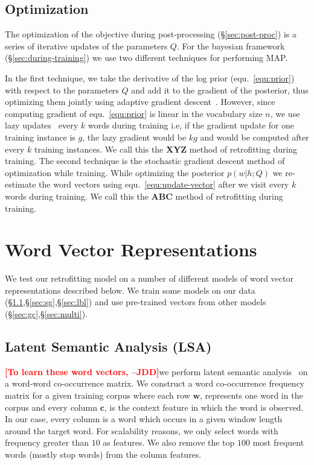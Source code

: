 \documentclass[11pt]{article}
\newcommand{\jdd}[1]{\textcolor{red}{\bf\small [#1 --JDD]}}
\begin{document}
\subsection{Optimization}
\label{sec:optimization} 

The optimization of the objective during post-processing (\S\ref{sec:post-proc}) is a series of iterative
updates of the parameters $Q$. For the bayesian framework (\S\ref{sec:during-training}) we use two different
techniques for performing MAP. 

In the first technique, we take the derivative of the log prior (equ.~\ref{equ:prior}) with respect to the
parameters $Q$ and add it to the gradient of the posterior, thus optimizing them jointly
using adaptive gradient descent~\cite{Duchi:EECS-2010-24}.
However, since computing gradient of equ.~\ref{equ:prior}
is linear in the vocabulary size $n$, we use lazy updates~\cite{Carpenter08lazysparse} every
$k$ words during training i.e, if the gradient update for one training instance is $g$, the
lazy gradient would be $kg$ and would be computed after every $k$ training instances.
We call this the \textbf{XYZ} method of retrofitting during training.
The second technique is the stochastic gradient descent method of optimization 
while training. While optimizing the posterior $p(w|h;Q)$ we re-estimate the 
word vectors using equ.~\ref{equ:update-vector} after we visit every $k$ words during 
training. We call this the \textbf{ABC} method of retrofitting during training.

\section{Word Vector Representations}
\label{sec:vectors}

We test our retrofitting model on a number of different models of word vector
representations described below. We train some models on our data 
(\S\ref{sec:lsa},\S\ref{sec:sg},\S\ref{sec:lbl})
and use pre-trained vectors from other models (\S\ref{sec:gc},\S\ref{sec:multi}).

\subsection{Latent Semantic Analysis (LSA)}
\label{sec:lsa}

\jdd{To learn these word vectors, }we perform latent semantic analysis~\cite{deerwester-90} on a word-word co-occurrence matrix.
We construct a word co-occurrence frequency matrix for a given training corpus where
each row $\boldsymbol{w}$, represents one word in the corpus and every column $\boldsymbol{c}$, is the context 
feature in which the word is observed. In our case, every column is a word which occurs
in a given window length around the target word. For scalability reasons, we
only select words with frequency greater than $10$ as features. We also remove
the top $100$ most frequent words (mostly stop words) from the column features.
\end{document}
